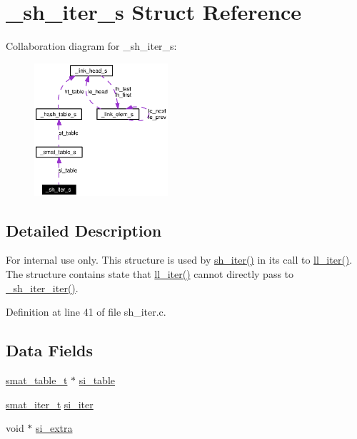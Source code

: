 \hypertarget{struct__sh__iter__s}{
\section{\_\-sh\_\-iter\_\-s Struct Reference}
\label{struct__sh__iter__s}
}
Collaboration diagram for \_\-sh\_\-iter\_\-s:\begin{figure}[H]
\begin{center}
\leavevmode
\includegraphics[width=140pt]{struct__sh__iter__s__coll__graph}
\end{center}
\end{figure}


\subsection{Detailed Description}
\begin{Desc}
\item[For internal use only.]
This structure is used by \hyperlink{group__dbprim__smat_ga21}{sh\_\-iter()} in its call to \hyperlink{group__dbprim__link_ga10}{ll\_\-iter()}. The structure contains state that \hyperlink{group__dbprim__link_ga10}{ll\_\-iter()} cannot directly pass to \hyperlink{group__dbprim__smat_ga29}{\_\-sh\_\-iter\_\-iter()}.\end{Desc}




Definition at line 41 of file sh\_\-iter.c.\subsection*{Data Fields}
\begin{CompactItemize}
\item 
\hyperlink{struct__smat__table__s}{smat\_\-table\_\-t} $\ast$ \hyperlink{struct__sh__iter__s_o0}{si\_\-table}
\item 
\hyperlink{group__dbprim__smat_ga4}{smat\_\-iter\_\-t} \hyperlink{struct__sh__iter__s_o1}{si\_\-iter}
\item 
void $\ast$ \hyperlink{struct__sh__iter__s_o2}{si\_\-extra}
\end{CompactItemize}


